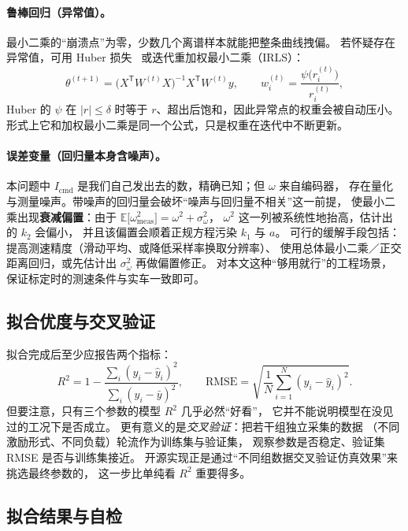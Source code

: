 \documentclass[cn,blue,11pt,device=normal]{elegantnote}
\newcommand{\Icmd}{I_{\mathrm{cmd}}{}}
\begin{document}
\paragraph{鲁棒回归（异常值）。}
最小二乘的“崩溃点”为零，少数几个离谱样本就能把整条曲线拽偏。
若怀疑存在异常值，可用 Huber 损失~\cite{huber2009robust} 或迭代重加权最小二乘（IRLS）：
\begin{equation}
  \theta^{(t+1)} = \bigl(X^{\mathsf T}W^{(t)}X\bigr)^{-1}X^{\mathsf T}W^{(t)}y,
  \qquad w_i^{(t)} = \frac{\psi\bigl(r_i^{(t)}\bigr)}{r_i^{(t)}},
\end{equation}
Huber 的 $\psi$ 在 $|r|\le\delta$ 时等于 $r$、超出后饱和，因此异常点的权重会被自动压小。
形式上它和加权最小二乘是同一个公式，只是权重在迭代中不断更新。

\paragraph{误差变量（回归量本身含噪声）。}
本问题中 $\Icmd$ 是我们自己发出去的数，精确已知；但 $\omega$ 来自编码器，
存在量化与测量噪声。带噪声的回归量会破坏“噪声与回归量不相关”这一前提，
使最小二乘出现\textbf{衰减偏置}：由于
$\mathbb{E}\bigl[\omega_{\mathrm{meas}}^{2}\bigr]=\omega^{2}+\sigma_\omega^{2}$，
$\omega^2$ 这一列被系统性地抬高，估计出的 $k_2$ 会偏小，
并且该偏置会顺着正规方程污染 $k_1$ 与 $a$。
可行的缓解手段包括：提高测速精度（滑动平均、或降低采样率换取分辨率）、
使用总体最小二乘／正交距离回归，或先估计出 $\sigma_\omega^{2}$ 再做偏置修正。
对本文这种“够用就行”的工程场景，保证标定时的测速条件与实车一致即可。

\subsection{拟合优度与交叉验证}

拟合完成后至少应报告两个指标：
\begin{equation}
  R^{2} = 1-\frac{\sum_i (y_i-\hat y_i)^2}{\sum_i (y_i-\bar y)^2},
  \qquad
  \mathrm{RMSE} = \sqrt{\frac{1}{N}\sum_{i=1}^{N}(y_i-\hat y_i)^{2}} .
\end{equation}
但要注意，只有三个参数的模型 $R^2$ 几乎必然“好看”，
它并不能说明模型在没见过的工况下是否成立。
更有意义的是\emph{交叉验证}：把若干组独立采集的数据
（不同激励形式、不同负载）轮流作为训练集与验证集，
观察参数是否稳定、验证集 RMSE 是否与训练集接近。
开源实现正是通过“不同组数据交叉验证仿真效果”来挑选最终参数的，
这一步比单纯看 $R^2$ 重要得多。

\subsection{拟合结果与自检}
\end{document}
